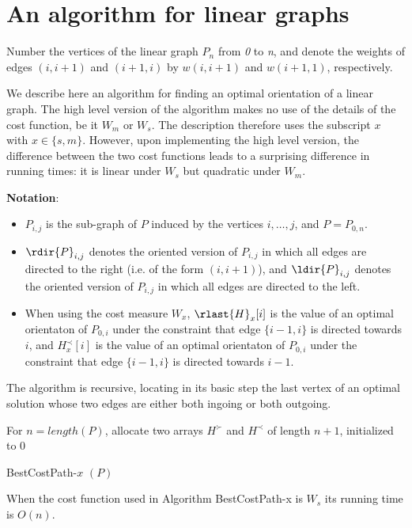 \section{An algorithm for linear graphs}\label{s.2}
Number the vertices of the linear graph  $P_n$ from \textit{0} to \textit{n}, and denote the weights of
edges $(i,i+1)$ and  $(i+1,i)$ by $w(i,i+1)$ and $w(i+1,1)$, respectively.

We describe here an algorithm for finding an optimal orientation 
of a linear graph. The high level version of the algorithm makes no use of the details
of the cost function, be it $W_m$ or $W_s$. The description therefore uses the subscript $x$ with $x\in \{s,m\}$. However, upon implementing the high level version, the difference between 
the two cost functions leads to a surprising difference in running times: it is linear 
under $W_s$ but quadratic under $W_m$.
\bigskip

{\bf Notation}:
\begin{itemize}
\item $P_{i, j}$ is the sub-graph of $P$ induced by the vertices $i,  \ldots, j$, and $P=P_{0,n}$. 
\item $\rdir{P}_{i, j}$ denotes the oriented version 
of $P_{i, j}$ in which all edges are directed to the right (i.e. of the form $(i, {i+1})$),
and $\ldir{P}_{i, j}$ denotes the oriented version 
of $P_{i, j}$ in which all edges are directed to the left.
\item When using the cost measure $W_x$, $\rlast{H}_x[i]$ is the value of an optimal orientaton of $P_{0, i}$ under the constraint
that edge $\{i-1,i\}$ is directed towards $i$, and $H_x^{\prec}[i]$ is the value of an optimal orientaton of $P_{0, i}$ under the constraint
that edge $\{i-1,i\}$ is directed towards $i-1$.
\end{itemize}

The algorithm is recursive, locating in its basic step the last 
vertex of an optimal solution whose two edges are either both
ingoing or both outgoing. 
\bigskip

\begin{algorithm}
	For $n= length(P)$, allocate two arrays $H^{\succ}$ and $H^{\prec}$ of length $n+1$,  initialized to $0$\;
	\;
	\caption{BestCostPath-$x$ $(P)$}
	\label{algo:H}
\end{algorithm}
\begin{theorem}
When the cost function used in Algorithm BestCostPath-x is $W_s$ its running time is $O(n)$.
\end{theorem}

